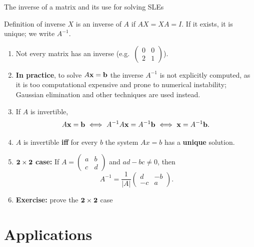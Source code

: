 \documentclass[9pt]{beamer}
\begin{document}
\begin{frame}{The inverse of a matrix and its use for solving SLEs}
\small
\begin{block}{Definition of inverse}
\(X\) is an inverse of \(A\) if \(AX=XA=I\). If it exists, it is unique; we write \(A^{-1}\).
\end{block}

\begin{enumerate}[leftmargin = 0.6cm, label = $\bullet$, rightmargin = 0.4cm]
    \item Not every matrix has an inverse (e.g.\ \(\begin{pmatrix}0&0\\2&1\end{pmatrix}\)).
    \medskip

    \item \textbf{In practice}, to solve \(A{\bf x}={\bf b}\) the inverse \(A^{-1}\) is not explicitly computed, as it is too computational expensive and prone to numerical instability; Gaussian elimination and other techniques are used instead.

    \item If \(A\) is invertible,
    \[
    A{\bf x}={\bf b} \ \Longleftrightarrow\ A^{-1}A{\bf x}=A^{-1}{\bf b} \ \Longleftrightarrow\ {\bf x}=A^{-1}{\bf b}.
    \]
    
    \item \(A\) is invertible \textbf{iff} for every \(b\) the system \(Ax=b\) has a \textbf{unique} solution.

    \item ${\bf 2\times2}$ \textbf{case:} If \(A=\begin{pmatrix} a&b\\ c&d \end{pmatrix}\) and \(ad-bc\neq 0\), then
    \[
    \ A^{-1}=\frac{1}{|A|}\begin{pmatrix} d&-b\\ -c&a \end{pmatrix}.
    \]

    \item \textbf{Exercise:} prove the $\bf 2\times2$ case
\end{enumerate}

\end{frame}

\section{Applications}
\end{document}
